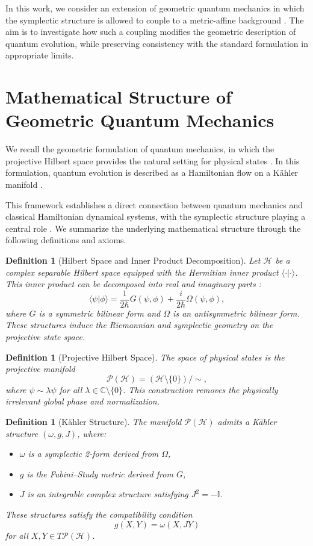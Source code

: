 \documentclass[11pt, a4paper]{article}
\newtheorem{definition}[theorem]{Definition}
\begin{document}
In this work, we consider an extension of geometric quantum mechanics in
which the symplectic structure is allowed to couple to a metric-affine
background \cite{hehl1995,shapiro2002}. The aim is to investigate how such
a coupling modifies the geometric description of quantum evolution, while
preserving consistency with the standard formulation in appropriate limits.

\section{Mathematical Structure of Geometric Quantum Mechanics}

We recall the geometric formulation of quantum mechanics, in which the
projective Hilbert space provides the natural setting for physical states
\cite{kibble1979,ashtekar1999,brody2001}. In this formulation, quantum
evolution is described as a Hamiltonian flow on a K\"ahler manifold
\cite{anandan1990,heydari2016}.

This framework establishes a direct connection between quantum mechanics
and classical Hamiltonian dynamical systems, with the symplectic structure
playing a central role \cite{abraham1978,arnold1989}. We summarize the
underlying mathematical structure through the following definitions
and axioms.

\begin{definition}[Hilbert Space and Inner Product Decomposition]
Let $\mathcal{H}$ be a complex separable Hilbert space equipped with the
Hermitian inner product $\langle \cdot | \cdot \rangle$. This inner product
can be decomposed into real and imaginary parts \cite{heydari2015}:
\[
\langle \psi | \phi \rangle
= \frac{1}{2\hbar} G(\psi, \phi)
+ \frac{i}{2\hbar} \Omega(\psi, \phi),
\]
where $G$ is a symmetric bilinear form and $\Omega$ is an antisymmetric
bilinear form. These structures induce the Riemannian and symplectic
geometry on the projective state space.
\end{definition}

\begin{definition}[Projective Hilbert Space]
The space of physical states is the projective manifold
\[
\mathcal{P}(\mathcal{H}) = (\mathcal{H} \setminus \{0\}) / \sim,
\]
where $\psi \sim \lambda \psi$ for all $\lambda \in \mathbb{C} \setminus \{0\}$.
This construction removes the physically irrelevant global phase and
normalization.
\end{definition}

\begin{definition}[K\"ahler Structure]
The manifold $\mathcal{P}(\mathcal{H})$ admits a K\"ahler structure
$(\omega, g, J)$, where:
\begin{itemize}
    \item $\omega$ is a symplectic 2-form derived from $\Omega$,
    \item $g$ is the Fubini--Study metric derived from $G$,
    \item $J$ is an integrable complex structure satisfying $J^2 = -\mathbb{I}$.
\end{itemize}
These structures satisfy the compatibility condition
\[
g(X,Y) = \omega(X, JY)
\]
for all $X,Y \in T\mathcal{P}(\mathcal{H})$.
\end{definition}
\end{document}
